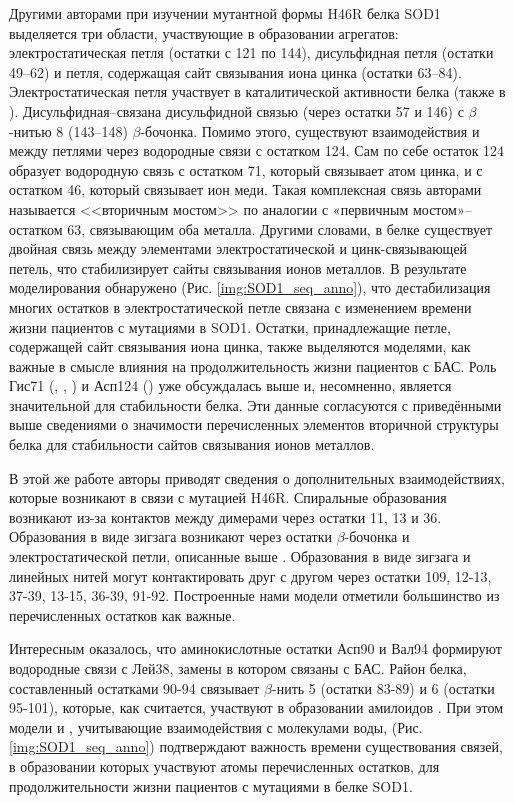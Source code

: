Другими авторами \cite{Antonyuk2005} при изучении мутантной формы H46R белка SOD1 выделяется три области, участвующие в образовании агрегатов: электростатическая петля (остатки с 121 по 144), дисульфидная петля (остатки  49–62) и петля, содержащая сайт связывания иона цинка (остатки  63–84).  Электростатическая петля участвует в каталитической активности белка (также в \cite{Keerthana2015}). Дисульфидная--связана дисульфидной связью (через остатки 57 и 146) с $\beta$-нитью 8 (143–148) $\beta$-бочонка. Помимо этого, существуют взаимодействия и между петлями через водородные связи с остатком 124. Сам по себе остаток 124 образует водородную связь с остатком 71, который связывает атом цинка, и с остатком 46, который связывает ион меди. Такая комплексная связь авторами называется <<вторичным мостом>> по аналогии с «первичным мостом»--остатком 63, связывающим оба металла. Другими словами, в белке существует двойная связь между элементами электростатической и цинк-связывающей петель, что стабилизирует сайты связывания ионов металлов. В результате моделирования обнаружено (Рис. \ref{img:SOD1_seq_anno}), что дестабилизация многих остатков в электростатической петле связана с изменением времени жизни пациентов с мутациями в SOD1. Остатки, принадлежащие петле, содержащей сайт связывания иона цинка, также выделяются моделями, как важные в смысле влияния на продолжительность жизни пациентов с БАС. Роль Гис71 (\modelpphb{}, \modelpwhb{}, \modelwbr{}) и Асп124 (\modelwbr{}) уже обсуждалась выше и, несомненно, является значительной для стабильности белка. Эти данные согласуются с приведёнными выше сведениями о значимости перечисленных элементов вторичной структуры белка для стабильности сайтов связывания ионов металлов. 

В этой же работе \cite{Antonyuk2005} авторы приводят сведения о дополнительных взаимодействиях, которые возникают в связи с мутацией H46R. Спиральные образования возникают из-за контактов между димерами через остатки 11, 13 и 36. Образования в виде зигзага возникают через остатки $\beta$-бочонка и электростатической петли, описанные выше \cite{Elam2003}. Образования в виде зигзага и линейных нитей могут контактировать друг с другом через остатки 109, 12-13, 37-39, 13-15, 36-39, 91-92. Построенные нами модели отметили большинство из перечисленных остатков как важные.

Интересным оказалось, что  аминокислотные остатки Асп90 и Вал94 формируют водородные связи с Лей38, замены в котором связаны с БАС. Район белка, составленный остатками 90-94 связывает  $\beta$-нить 5 (остатки 83-89) и 6 (остатки 95-101), которые, как считается, участвуют в образовании амилоидов \cite{Banci2009}. При этом модели \modelwbr{} и \modelpwhb{}, учитывающие взаимодействия с молекулами воды, (Рис. \ref{img:SOD1_seq_anno}) подтверждают важность времени существования связей, в образовании которых участвуют атомы перечисленных остатков, для продолжительности жизни пациентов с мутациями в белке SOD1.

